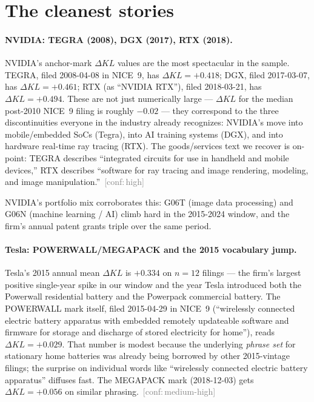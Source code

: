 \documentclass[11pt]{article}
\newcommand{\dKL}{\Delta KL}
\newcommand{\conf}[1]{\textcolor{gray}{\footnotesize\,[conf:\,#1]}}
\begin{document}
\section{The cleanest stories}

\paragraph{NVIDIA: TEGRA (2008), DGX (2017), RTX (2018).}
NVIDIA's anchor-mark $\dKL$ values are the most spectacular in the
sample. TEGRA, filed 2008-04-08 in NICE~9, has $\dKL = +0.418$;
DGX, filed 2017-03-07, has $\dKL = +0.461$; RTX (as ``NVIDIA RTX''),
filed 2018-03-21, has $\dKL = +0.494$. These are not just numerically
large --- $\dKL$ for the median post-2010 NICE~9 filing is roughly
$-0.02$ --- they correspond to the three discontinuities everyone in
the industry already recognizes: NVIDIA's move into mobile/embedded
SoCs (Tegra), into AI training systems (DGX), and into hardware
real-time ray tracing (RTX). The goods/services text we recover is
on-point: TEGRA describes ``integrated circuits for use in handheld
and mobile devices,'' RTX describes ``software for ray tracing and
image rendering, modeling, and image manipulation.'' \conf{high}

NVIDIA's portfolio mix corroborates this: G06T (image data
processing) and G06N (machine learning / AI) climb hard in the
2015-2024 window, and the firm's annual patent grants triple over
the same period.

\paragraph{Tesla: POWERWALL/MEGAPACK and the 2015 vocabulary jump.}
Tesla's 2015 annual mean $\dKL$ is $+0.334$ on $n=12$ filings ---
the firm's largest positive single-year spike in our window and the
year Tesla introduced both the Powerwall residential battery and the
Powerpack commercial battery. The POWERWALL mark itself, filed
2015-04-29 in NICE~9 (``wirelessly connected electric battery
apparatus with embedded remotely updateable software and firmware for
storage and discharge of stored electricity for home''), reads
$\dKL = +0.029$. That number is modest because the underlying
\emph{phrase set} for stationary home batteries was already being
borrowed by other 2015-vintage filings; the surprise on individual
words like ``wirelessly connected electric battery apparatus''
diffuses fast. The MEGAPACK mark (2018-12-03) gets $\dKL = +0.056$ on
similar phrasing. \conf{medium-high}
\end{document}
